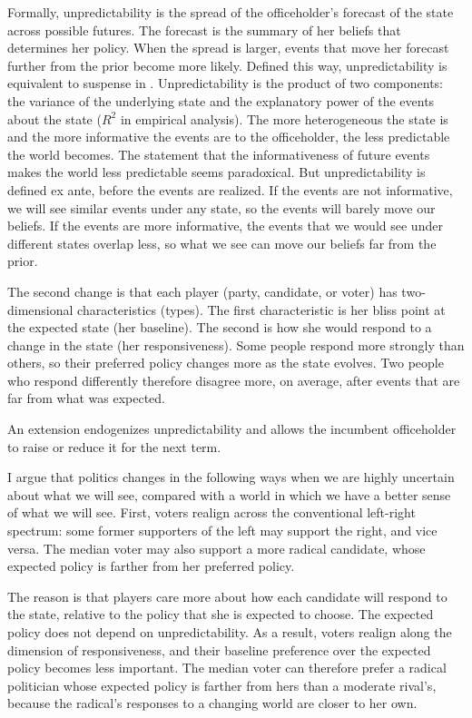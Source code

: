 \documentclass[12pt,letterpaper]{article}
\begin{document}
Formally, unpredictability is the spread of the officeholder's forecast of the state across possible futures. The forecast is the summary of her beliefs that determines her policy. When the spread is larger, events that move her forecast further from the prior become more likely. Defined this way, unpredictability is equivalent to suspense in \citet{ElyFrankelKamenica2015}. Unpredictability is the product of two components: the variance of the underlying state and the explanatory power of the events about the state ($R^2$ in empirical analysis). The more heterogeneous the state is and the more informative the events are to the officeholder, the less predictable the world becomes. The statement that the informativeness of future events makes the world less predictable seems paradoxical. But unpredictability is defined ex ante, before the events are realized. If the events are not informative, we will see similar events under any state, so the events will barely move our beliefs. If the events are more informative, the events that we would see under different states overlap less, so what we see can move our beliefs far from the prior.

The second change is that each player (party, candidate, or voter) has two-dimensional characteristics (types). The first characteristic is her bliss point at the expected state (her baseline). The second is how she would respond to a change in the state (her responsiveness). Some people respond more strongly than others, so their preferred policy changes more as the state evolves. Two people who respond differently therefore disagree more, on average, after events that are far from what was expected.

An extension endogenizes unpredictability and allows the incumbent officeholder to raise or reduce it for the next term.

I argue that politics changes in the following ways when we are highly uncertain about what we will see, compared with a world in which we have a better sense of what we will see. First, voters realign across the conventional left-right spectrum: some former supporters of the left may support the right, and vice versa. The median voter may also support a more radical candidate, whose expected policy is farther from her preferred policy.

The reason is that players care more about how each candidate will respond to the state, relative to the policy that she is expected to choose. The expected policy does not depend on unpredictability. As a result, voters realign along the dimension of responsiveness, and their baseline preference over the expected policy becomes less important. The median voter can therefore prefer a radical politician whose expected policy is farther from hers than a moderate rival's, because the radical's responses to a changing world are closer to her own.
\end{document}
